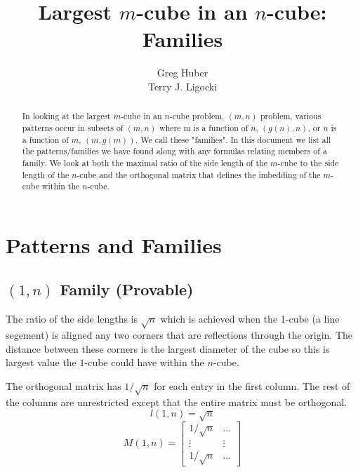 \documentclass[12pt,titlepage]{article}
\title{\bf Largest $m$-cube in an $n$-cube: \\
       Families
      }
\author{Greg Huber \\
        Terry J. Ligocki
       }
\begin{document}
\maketitle

\begin{abstract}
In looking at the largest $m$-cube in an $n$-cube problem, $(m,n)$ problem,
various patterns occur in subsets of $(m,n)$ where m is a function of $n$,
$(g(n),n)$, or $n$ is a function of $m$, $(m,g(m))$.  We call these "families".
In this document we list all the patterns/families we have found along with
any formulas relating members of a family.  We look at both the maximal ratio
of the side length of the $m$-cube to the side length of the $n$-cube and the
orthogonal matrix that defines the imbedding of the $m$-cube within the
$n$-cube.
\end{abstract}

\section{Patterns and Families}

\subsection{$(1,n)$ Family (Provable)}
\label{sec:1_n}
The ratio of the side lengths is $\sqrt{n}$ which is achieved when the 1-cube
(a line segement) is aligned any two corners that are reflections through the
origin.  The distance between these corners is the largest diameter of the
cube so this is largest value the $1$-cube could have within the $n$-cube.

The orthogonal matrix has $1/\sqrt{n}$ for each entry in the first column.
The rest of the columns are unrestricted except that the entire matrix must
be orthogonal.
\begin{equation*}
l(1,n) = \sqrt{n}
\end{equation*}
\begin{equation*}
M(1,n) =
\begin{bmatrix}
1/\sqrt{n} & \ldots \\
\vdots     & \vdots \\
1/\sqrt{n} & \ldots
\end{bmatrix}
\end{equation*}
\end{document}
